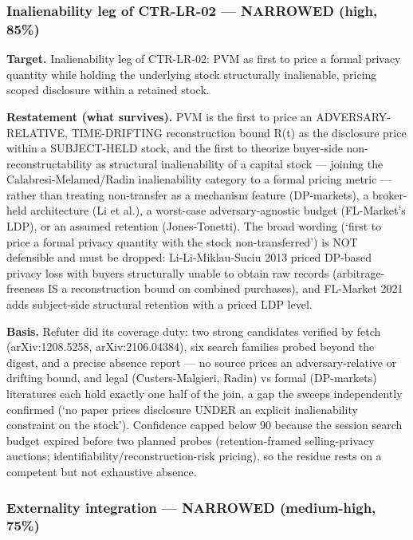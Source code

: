 \documentclass[
  11pt,
]{article}
\begin{document}
\subsubsection{Inalienability leg of CTR-LR-02 --- NARROWED (high,
85\%)}\label{inalienability-leg-of-ctr-lr-02-narrowed-high-85}

\textbf{Target.} Inalienability leg of CTR-LR-02: PVM as first to price
a formal privacy quantity while holding the underlying stock
structurally inalienable, pricing scoped disclosure within a retained
stock.

\textbf{Restatement (what survives).} PVM is the first to price an
ADVERSARY-RELATIVE, TIME-DRIFTING reconstruction bound R(t) as the
disclosure price within a SUBJECT-HELD stock, and the first to theorize
buyer-side non-reconstructability as structural inalienability of a
capital stock --- joining the Calabresi-Melamed/Radin inalienability
category to a formal pricing metric --- rather than treating
non-transfer as a mechanism feature (DP-markets), a broker-held
architecture (Li et al.), a worst-case adversary-agnostic budget
(FL-Market's LDP), or an assumed retention (Jones-Tonetti). The broad
wording (`first to price a formal privacy quantity with the stock
non-transferred') is NOT defensible and must be dropped:
Li-Li-Miklau-Suciu 2013 priced DP-based privacy loss with buyers
structurally unable to obtain raw records (arbitrage-freeness IS a
reconstruction bound on combined purchases), and FL-Market 2021 adds
subject-side structural retention with a priced LDP level.

\textbf{Basis.} Refuter did its coverage duty: two strong candidates
verified by fetch (arXiv:1208.5258, arXiv:2106.04384), six search
families probed beyond the digest, and a precise absence report --- no
source prices an adversary-relative or drifting bound, and legal
(Custers-Malgieri, Radin) vs formal (DP-markets) literatures each hold
exactly one half of the join, a gap the sweeps independently confirmed
(`no paper prices disclosure UNDER an explicit inalienability constraint
on the stock'). Confidence capped below 90 because the session search
budget expired before two planned probes (retention-framed
selling-privacy auctions; identifiability/reconstruction-risk pricing),
so the residue rests on a competent but not exhaustive absence.

\subsubsection{Externality integration --- NARROWED (medium-high,
75\%)}\label{externality-integration-narrowed-medium-high-75}
\end{document}

